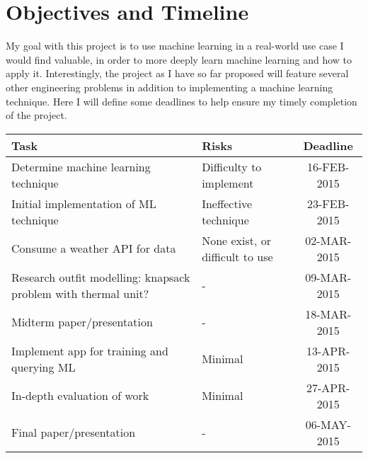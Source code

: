 \section{Objectives and Timeline}
\label{section:objectives}
My goal with this project is to use machine learning in a real-world use case I would find valuable, in order to
more deeply learn machine learning and how to apply it. Interestingly, the project as I have so far proposed will
feature several other engineering problems in addition to implementing a machine learning technique. Here I will
define some deadlines to help ensure my timely completion of the project.

\begin{center}
 \begin{tabular}{||l l c ||}
 \hline
 Task & Risks & Deadline \\ [0.5ex]
 \hline\hline
 Determine machine learning technique & Difficulty to implement & 16-FEB-2015 \\
 \hline
 Initial implementation of ML technique & Ineffective technique & 23-FEB-2015 \\
 \hline
 Consume a weather API for data & None exist, or difficult to use & 02-MAR-2015 \\
 \hline
 Research outfit modelling: knapsack problem with thermal unit? & - & 09-MAR-2015 \\
 \hline
 Midterm paper/presentation & - & 18-MAR-2015 \\
 \hline
 Implement app for training and querying ML & Minimal & 13-APR-2015 \\
 \hline
 In-depth evaluation of work & Minimal & 27-APR-2015 \\
 \hline
 Final paper/presentation & - & 06-MAY-2015 \\
 \hline
\end{tabular}
\end{center}